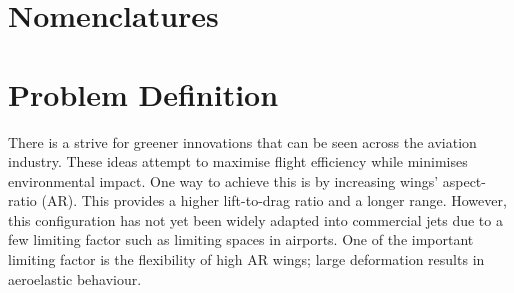 \documentclass[11pt]{article}
\begin{document}
\newpage
\tableofcontents
\newpage
\listoffigures
\listoftables

\section*{Nomenclatures}
\begin{table}[H]
    
    \label{tab:nomen}
\end{table}
\cleardoublepage
\newpage
\section{Problem Definition}
\label{sec:prob-def}
There is a strive for greener innovations that can be seen across the aviation industry. These ideas attempt to maximise flight efficiency while minimises environmental impact. One way to achieve this is by increasing wings' aspect-ratio (AR). This provides a higher lift-to-drag ratio and a longer range. However, this configuration has not yet been widely adapted into commercial jets due to a few limiting factor such as limiting spaces in airports. One of the important limiting factor is the flexibility of high AR wings; large deformation results in aeroelastic behaviour.\\ 
\end{document}
